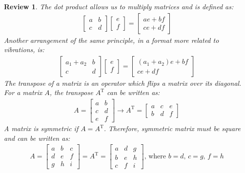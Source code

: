 \documentclass[12pt,letter]{article}
\numberwithin{ex}{section} %
\newtheorem{re}{Review}
\numberwithin{re}{section} %
\newenvironment{review}{\begin{mdframed}[middlelinewidth=2mm,roundcorner=20pt]\begin{re}\normalfont}{\end{re}\end{mdframed}}
\begin{document}
\begin{review}
The dot product allows us to multiply matrices and is defined as:
\begin{eqnarray}
  \begin{bmatrix} a & b \\ c & d \end{bmatrix}\begin{bmatrix} e \\  f \end{bmatrix} = \begin{bmatrix} ae+bf \\ ce + df \end{bmatrix}
\end{eqnarray}
Another arrangement of the same principle, in a format more related to vibrations, is:
\begin{eqnarray}
  \begin{bmatrix} a_1+a_2 & b \\ c & d \end{bmatrix}\begin{bmatrix} e \\  f \end{bmatrix} = \begin{bmatrix} (a_1+a_2)e+bf \\ ce + df \end{bmatrix}
\end{eqnarray}
The transpose of a matrix is an  operator which flips a matrix over its diagonal. For a matrix $A$, the transpose $A^\text{T}$ can be written as:
\begin{eqnarray}
   A = \begin{bmatrix} a & b \\ c & d \\ e & f\end{bmatrix} \rightarrow A^\text{T} = \begin{bmatrix} a & c & e \\  b & d & f \end{bmatrix}
\end{eqnarray}
A matrix is symmetric if $A =A^\text{T}$. Therefore, symmetric matrix must be square and can be written as:
\begin{eqnarray}
   A = \begin{bmatrix} a & b &c \\ d & e & f\\ g & h & i \end{bmatrix} = A^\text{T} = \begin{bmatrix} a & d & g \\ b & e & h \\ c & f & i \end{bmatrix}\text{, where } b=d \text{, }c=g\text{, }f=h

\end{eqnarray}
\end{review}
\end{document}
